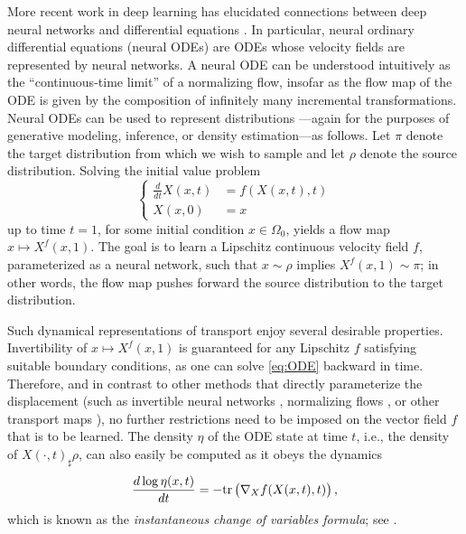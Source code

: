 More recent work in deep learning has elucidated connections between deep neural networks and differential equations \citep{TransportAnalysisofDL,NumericalSchemeODE,PDEmotivatedNN}. In particular, neural ordinary differential equations (neural ODEs) \citep{NeuralODE} are ODEs whose velocity fields are represented by neural networks. A neural ODE can be understood intuitively as the ``continuous-time limit'' of a normalizing flow, insofar as the flow map of the ODE is given by the composition of infinitely many incremental transformations. Neural ODEs can be used to represent distributions \citep{ffjord}---again for the purposes of generative modeling, inference, or density estimation---as follows. Let $\pi$ denote the target distribution from which we wish to sample and let $\rho$ denote the source distribution. Solving the initial value problem
\begin{equation}\label{eq:ODE}
    \begin{cases}
        \frac{d }{dt} X(x,t) &= f \left (X(x,t), t \right )\\
                    X(x, 0) &= x
    \end{cases}
\end{equation}
up to time $t=1$, for some initial condition $x \in \Omega_0$, yields a flow map $x \mapsto X^f(x, 1)$. The goal is to learn a Lipschitz continuous velocity field $f$, parameterized as a neural network, such that $x\sim \rho$ implies $X^f(x,1)\sim \pi$; in other words, the flow map pushes forward the source distribution to the target distribution.
    
Such dynamical representations of transport enjoy several desirable properties. Invertibility of $x\mapsto X^f(x,1)$ is guaranteed for any Lipschitz $f$ satisfying suitable boundary conditions, as one can solve \eqref{eq:ODE} backward in time. Therefore, and in contrast to other methods that directly parameterize the displacement (such as invertible neural networks \citep{InvNN}, normalizing flows \citep{NormalizingFlowIntro}, or other transport maps \citep{baptista23}), no further restrictions need to be imposed on the vector field $f$ that is to be learned. The density $\eta$ of the ODE state at time $t$, 
i.e., the density of $X(\cdot,t)_\sharp \rho$, 
can also easily be computed as it obeys the dynamics
$$\frac{d\log \eta(x,t)}{d t} = -{\mathrm{tr}} \left (\nabla_X f(X(x,t), t) \right ),$$ 
which is known as the \emph{instantaneous change of variables formula}; see \citet{NeuralODE}.


